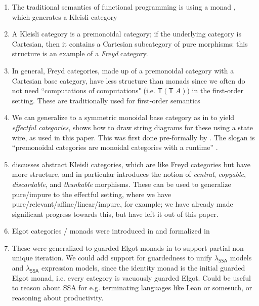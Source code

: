 \documentclass[acmsmall,screen,review]{acmart}
\newcounter{todos}
\newcommand{\todo}[1]{\stepcounter{todos} \textcolor{red}{TODO \arabic{todos}: #1}}
\newcommand{\ms}[1]{\ensuremath{\mathsf{#1}}}
\newcommand{\isotopessa}{\(\lambda_{\ms{SSA}}\)}
\begin{document}
\begin{enumerate}
  \item The traditional semantics of functional programming is using a monad \citet{moggi-91-monad},
  which generates a Kleisli category
  \item A Kleisli category is a premonoidal category; if the underlying category is Cartesian, then
  it contains a Cartesian subcategory of pure morphisms: this structure is an example of a
  \emph{Freyd} category. 
  \item In general, Freyd categories, made up of a premonoidal category with a Cartesian base
  category, have less structure than monads since we often do not need ``computations of
  computations" (i.e. $\ms{T}(\ms{T}\;A)$) in the first-order setting. These are traditionally used
  for first-order semantics
  \cite{power-premonoidal-02}
  \item We can generalize to a symmetric monoidal base category as in \citet{staton-impure-13} to
  yield \emph{effectful categories}, \citet{promonad} shows how to draw string diagrams for these
  using a state wire, as used in this paper. This was first done pre-formally by
  \citet{jeffrey-premonoidal-97}. The slogan is ``premonoidal categories are monoidal categories
  with a runtime'' \cite{promonad}.
  \item \citet{fuhrmann-direct-1999} discusses abstract Kleisli categories, which are like Freyd
  categories but have more structure, and in particular introduces the notion of \emph{central},
  \emph{copyable}, \emph{discardable}, and \emph{thunkable} morphisms. These can be used to
  generalize pure/impure to the effectful setting, where we have pure/relevant/affine/linear/impure,
  for example; we have already made significant progress towards this, but have left it out of this
  paper.
  \item Elgot categories / monads were introduced in \citet{elgot-elgot-75} and formalized in
  \citet{adamek-elgot-11}
  \item These were generalized to guarded Elgot monads in
  \citet{coinductive-resumption-levy-goncharov-19} to support partial non-unique iteration. We could
  add support for guardedness to unify \isotopessa{} models and \isotopessa{} expression models,
  since the identity monad is the initial guarded Elgot monad, i.e. every category is vacuously
  guarded Elgot. Could be useful to reason about SSA for e.g. terminating languages like Lean or
  somesuch, or reasoning about productivity.
  
  
\end{enumerate}
\end{document}
